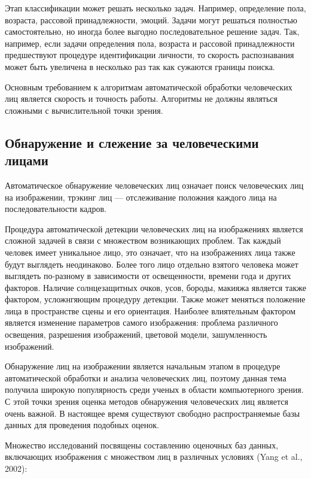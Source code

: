 Этап классификации может решать несколько задач. Например, определение пола, возраста, рассовой принадлежности, эмоций. Задачи могут решаться полностью самостоятельно, но иногда более выгодно последовательное решение задач. Так, например, если задачи определения пола, возраста и рассовой принадлежности предшествуют процедуре идентификации личности, то скорость распознавания может быть увеличена в несколько раз так как сужаются границы поиска.


Основным требованием к алгоритмам автоматической обработки человеческих лиц является скорость и точность работы. Алгоритмы не должны являться сложными с вычислительной точки зрения.



\subsection{Обнаружение и слежение за человеческими лицами}

Автоматическое обнаружение человеческих лиц означает поиск человеческих лиц на изображении, трэкинг лиц --- отслеживание положния каждого лица на последовательности кадров.


Процедура автоматической детекции человеческих лиц на изображениях является сложной задачей в связи с множеством возникающих проблем. Так каждый человек имеет уникальное лицо, это означает, что на изображениях лица также будут выглядеть неодинаково. Более того лицо отдельно взятого человека может выглядеть по-разному в зависимости от освещенности, времени года и других факторов. Наличие солнцезащитных очков, усов, бороды, макияжа является также фактором, усложнгяющим процедуру детекции. Также может меняться  положение лица в пространстве сцены и его ориентация. Наиболее влиятельным фактором является изменение параметров самого изображения: проблема различного освещения, разрешения изображений, цветовой модели, зашумленность изображений.

Обнаружение лиц на изображении является начальным этапом в процедуре автоматической обработки и анализа человеческих лиц, поэтому данная тема получила широкую популярность среди ученых в области компьютерного зрения. С этой точки зрения оценка методов обнаружения человеческих лиц является очень важной. В настоящее время существуют свободно распространяемые базы данных для проведения подобных оценок. 

Множество исследований посвящены составлению оценочных баз данных, включающих изображения с множеством лиц в различных условиях (Yang et al., 2002): 

